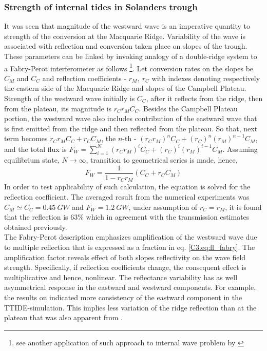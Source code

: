 \documentclass[12pt]{article}
\begin{document}
\subsubsection{Strength of internal tides in Solanders trough}
\label{C3.sec:disc_sw}
It was seen that magnitude of the westward wave is an imperative quantity to strength of the 
conversion at the Macquarie Ridge. Variability of the wave is associated with reflection and 
conversion taken place on slopes of the trough. These parameters can be linked by invoking 
analogy of a 
double-ridge system to a Fabry-Perot interferometer as follows \footnote{see another application of 
such approach to internal wave problem by \cite{mathur2010internal}}. Let conversion rates on the 
slopes be $C_M$ and $C_C$ and reflection coefficients - $r_M,~r_C$ with indexes denoting 
respectively the eastern side of the Macquarie Ridge and slopes of the Campbell Plateau. Strength 
of the westward wave initially is $C_C$, after it reflects from the ridge, then from the 
plateau, its magnitude is $r_C r_M C_C$. Besides the Campbell Plateau portion, the westward wave 
also includes contribution of the eastward wave that is first emitted from the ridge and then 
reflected from the 
plateau. So that, next term becomes $r_C r_M C_C + r_C C_M$, the $n$-th - $(r_C 
r_M)^n C_C + (r_C)^n (r_M)^{n-1} C_M$, and the total flux is $F_W = \sum_{i = 1}^N (r_C r_M)^i C_C 
+ (r_C)^i (r_M)^{i-1} C_M$. Assuming equilibrium state, $N \rightarrow \infty$, transition to 
geometrical series is made, hence,
\begin{equation}
\label{C3.eq:fl_fabry}
F_W = \frac{1}{1 - r_C r_M} (C_C + r_C C_M)
\end{equation}
In order to test applicability of such calculation, the equation is solved for the reflection 
coefficient. 
The averaged result 
from the numerical experiments  was $C_M \simeq C_C = 0.45~GW$ and 
$F_W = 1.2~GW$, under assumption of $r_C = r_M$, it is found that the reflection is $63\%$ which 
in agreement with the transmission estimates obtained previously.\\

The Fabry-Perot description emphasizes amplification of the westward wave due to multiple 
reflection that is expressed as a fraction in eq. \eqref{C3.eq:fl_fabry}. The amplification factor 
reveals effect of both slopes reflectivity on the wave field strength. Specifically, if reflection 
coefficients change, the consequent effect is multiplicative and hence, nonlinear. The reflectance 
variability has as well asymmetrical response in the eastward and westward components. For example, 
the 
results on  indicated more consistency of the eastward component in 
the 
TTIDE-simulation. This implies less variation of the ridge reflection than at the plateau that was 
also apparent from .\\
\end{document}
